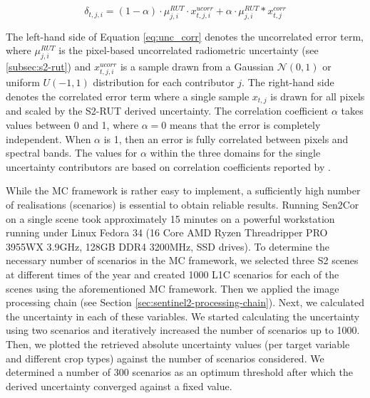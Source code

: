 \begin{equation}
    \label{eq:unc_corr}
    \delta_{t,j,i} = (1-\alpha) \cdot \mu_{j,i}^{RUT} \cdot x_{t,j,i}^{ucorr} + \alpha \cdot \mu_{j,i}^{RUT} * x_{t,j}^{corr}
\end{equation}

The left-hand side of Equation \ref{eq:unc_corr} denotes the uncorrelated error term, where $\mu_{j,i}^{RUT}$ is the pixel-based uncorrelated radiometric uncertainty (see \ref{subsec:s2-rut}) and $x_{t,j,i}^{ucorr}$ is a sample drawn from a Gaussian $\mathcal{N}(0,1)$ or uniform $U(-1,1)$ distribution for each contributor $j$. The right-hand side denotes the correlated error term where a single sample $x_{t,j}$ is drawn for all pixels and scaled by the \gls{S2-RUT} derived uncertainty. The correlation coefficient $\alpha$ takes values between 0 and 1, where $\alpha = 0$ means that the error is completely independent. When $\alpha$ is 1, then an error is fully correlated between pixels and spectral bands. The values for $\alpha$ within the three domains for the single uncertainty contributors are based on correlation coefficients reported by \cite[Table 1]{gorrono_providing_2018}.

While the  \gls{MC} framework is rather easy to implement, a sufficiently high number of realisations (scenarios) is essential to obtain reliable results. Running Sen2Cor on a single scene took approximately 15 minutes on a powerful workstation running under Linux Fedora 34 (16 Core AMD Ryzen Threadripper PRO 3955WX 3.9GHz, 128GB DDR4 3200MHz, SSD drives). To determine the necessary number of scenarios in the  \gls{MC} framework, we selected three \gls{S2} scenes at different times of the year and created 1000 L1C scenarios for each of the scenes using the aforementioned  \gls{MC} framework. Then we applied the image processing chain (see Section \ref{sec:sentinel2-processing-chain}). Next, we calculated the uncertainty in each of these variables. We started calculating the uncertainty using two scenarios and iteratively increased the number of scenarios up to 1000. Then, we plotted the retrieved absolute uncertainty values (per target variable and different crop types) against the number of scenarios considered. We determined a number of 300 scenarios as an optimum threshold after which the derived uncertainty converged against a fixed value.

